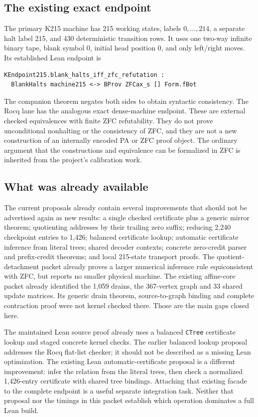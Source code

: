 \documentclass[11pt,letterpaper]{article}
\theoremstyle{definition}\newtheorem{definition}[theorem]{Definition}
\begin{document}
\subsection{The existing exact endpoint}

The primary K215 machine has 215 working states, labels $0,\ldots,214$, a
separate halt label 215, and 430 deterministic transition rows. It uses one
two-way infinite binary tape, blank symbol 0, initial head position 0, and only
left/right moves. Its established Lean endpoint is
\begin{lstlisting}
KEndpoint215.blank_halts_iff_zfc_refutation :
  BlankHalts machine215 <-> BProv ZFCax_s [] Form.fBot
\end{lstlisting}
The companion theorem negates both sides to obtain syntactic consistency.
The Rocq lane has the analogous exact dense-machine endpoint. These are
external checked equivalences with finite ZFC refutability. They do not prove
unconditional nonhalting or the consistency of ZFC, and they are not a new
construction of an internally encoded PA or ZFC proof object. The ordinary
argument that the constructions and equivalence can be formalized in ZFC is
inherited from the project's calibration work.

\subsection{What was already available}

The current proposals already contain several improvements that should not be
advertised again as new results: a single checked certificate plus a generic
mirror theorem; quotienting addresses by their trailing zero suffix; reducing
2,240 checkpoint entries to 1,426; balanced certificate lookup; automatic
certificate inference from literal trees; shared decoder contexts; concrete
zero-credit parser and prefix-credit theorems; and local 215-state transport
proofs. The quotient-detachment packet already proves a larger numerical
inference rule equiconsistent with ZFC, but reports no smaller physical
machine. The existing affine-core packet already identified the 1,059 drains,
the 367-vertex graph and 33 shared update matrices. Its generic drain theorem,
source-to-graph binding and complete contraction proof were not kernel checked
there. Those are the main gaps closed here.

The maintained Lean source proof already uses a balanced \texttt{CTree}
certificate lookup and staged concrete kernel checks. The earlier balanced
lookup proposal addresses the Rocq flat-list checker; it should not be described
as a missing Lean optimization. The existing Lean automatic-certificate
proposal is a different improvement: infer the relation from the literal trees,
then check a normalized 1,426-entry certificate with shared tree bindings.
Attaching that existing facade to the complete endpoint is a useful separate
integration task. Neither that proposal nor the timings in this packet establish
which operation dominates a full Lean build.
\end{document}
